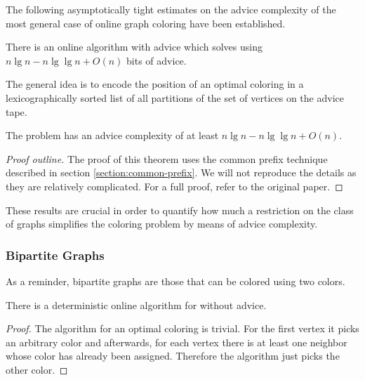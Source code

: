 The following asymptotically tight estimates on the advice complexity of
the most general case of online graph coloring have been established.

\begin{theorem}\label{theorem:general-graphs-upper}
    There is an online algorithm with advice which solves
     using $n \lg n - n \lg\lg n + O(n)$ bits of
    advice.
\end{theorem}

The general idea is to encode the position of an optimal coloring in a
lexicographically sorted list of all partitions of the set of vertices on
the advice tape.

\begin{theorem}\label{theorem:general-graphs-lower}
    The  problem has an advice complexity of at least
    $n \lg n - n \lg\lg n + O(n)$.
\end{theorem}

\begin{proof}[Proof outline]
    The proof of this theorem uses the common prefix technique described
    in section \ref{section:common-prefix}. We will not reproduce the
    details as they are relatively complicated. For a full proof, refer to
    the original paper.
\end{proof}

These results are crucial in order to quantify how much a restriction on
the class of graphs simplifies the coloring problem by means of advice
complexity.

\subsubsection{Bipartite Graphs}

As a reminder, bipartite graphs are those that can be colored using two
colors.

\begin{theorem}\label{theorem:bipartite-connected}
    There is a deterministic online algorithm for
     without advice.
\end{theorem}

\begin{proof}
    The algorithm for an optimal coloring is trivial. For the first vertex
    it picks an arbitrary color and afterwards, for each vertex there is
    at least one neighbor whose color has already been assigned. Therefore
    the algorithm just picks the other color.
\end{proof}


